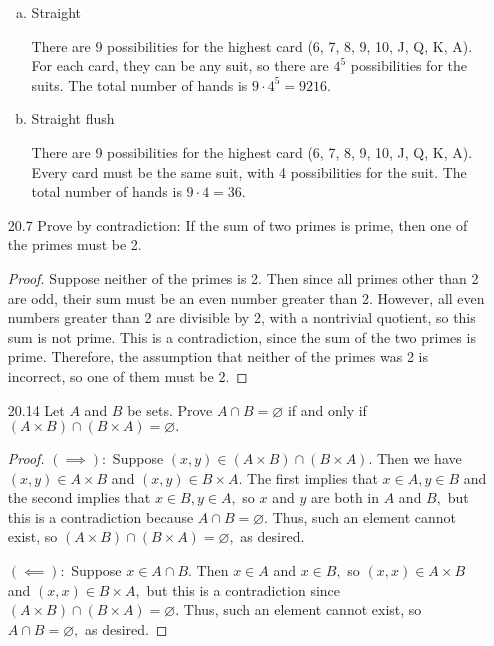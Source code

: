 \documentclass{article}
\begin{document}
\begin{itemize}
\begin{enumerate}[a.]
			\item Straight
				\begin{soln}
					There are 9 possibilities for the highest card (6, 7, 8, 9, 10, J, Q, K, A). For each card, they can be any suit, so there are $4^{5}$ possibilities for the suits. The total number of hands is $9\cdot 4^5=\boxed{9216.}$
				\end{soln}

			\item Straight flush
				\begin{soln}
					There are 9 possibilities for the highest card (6, 7, 8, 9, 10, J, Q, K, A). Every card must be the same suit, with 4 possibilities for the suit. The total number of hands is $9\cdot 4=\boxed{36.}$
				\end{soln}
				
		\end{enumerate}

	\item[20.7] Prove by contradiction: If the sum of two primes is prime, then one of the primes must be 2.
		\begin{proof}
			Suppose neither of the primes is 2. Then since all primes other than 2 are odd, their sum must be an even number greater than 2. However, all even numbers greater than 2 are divisible by 2, with a nontrivial quotient, so this sum is not prime. This is a contradiction, since the sum of the two primes is prime. Therefore, the assumption that neither of the primes was 2 is incorrect, so one of them must be 2.
		\end{proof}

		\newpage
	\item[20.14] Let $A$ and $B$ be sets. Prove $A\cap B=\varnothing$ if and only if $(A\times B)\cap (B\times A)=\varnothing.$
		\begin{proof}
			$(\implies):$ Suppose $(x, y)\in (A\times B)\cap (B\times A).$ Then we have $(x, y)\in A\times B$ and $(x, y)\in B\times A.$ The first implies that $x\in A, y\in B$ and the second implies that $x\in B, y\in A,$ so $x$ and $y$ are both in $A$ and $B,$ but this is a contradiction because $A\cap B=\varnothing.$ Thus, such an element cannot exist, so $(A\times B)\cap (B\times A)=\varnothing,$ as desired.

			$(\impliedby):$ Suppose $x\in A\cap B.$ Then $x\in A$ and $x\in B,$ so $(x, x)\in A\times B$ and $(x, x)\in B\times A,$ but this is a contradiction since $(A\times B)\cap (B\times A)=\varnothing.$ Thus, such an element cannot exist, so $A\cap B=\varnothing,$ as desired.
		\end{proof}


\end{itemize}
\end{document}
